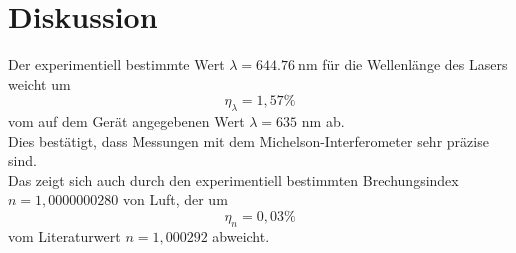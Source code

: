\section{Diskussion}
\label{sec:Diskussion}

Der experimentiell bestimmte Wert $\lambda = \SI{644,76}{\nano\metre}$ für die Wellenlänge des Lasers weicht um 
\begin{equation*}
    \eta_\lambda = 1,57\%
\end{equation*}
vom auf dem Gerät angegebenen Wert $\lambda = 635$ nm ab. \\
Dies bestätigt, dass Messungen mit dem Michelson-Interferometer sehr präzise sind.\\
Das zeigt sich auch durch den experimentiell bestimmten Brechungsindex $n = 1,0000000280$ von Luft, der um 
\begin{equation*}
    \eta_n = 0,03\%
\end{equation*}
vom Literaturwert $n = 1,000292$ abweicht.\\